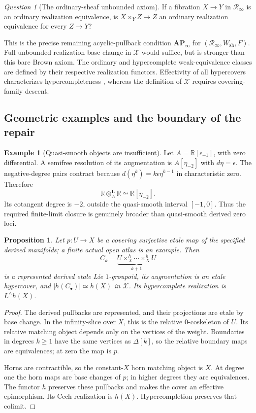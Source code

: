 \documentclass[12pt]{amsart}
\newtheorem{prop}[thm]{Proposition}
\theoremstyle{definition}
\newtheorem{example}[thm]{Example}
\theoremstyle{remark}
\newtheorem{question}[thm]{Question}
\numberwithin{equation}{section}
\newcommand{\R}{\mathbb R}
\begin{document}
\begin{question}[The ordinary-sheaf unbounded axiom]
\label{question:derived-unbounded-ordinary}
If a fibration $X\to Y$ in $\mathscr R_\infty$ is
an ordinary realization equivalence, is
$X\times_Y Z\to Z$ an ordinary realization
equivalence for every $Z\to Y$?
\end{question}

This is the precise remaining acyclic-pullback
condition $\mathbf{AP}_\infty$ for
$(\mathscr R_\infty,W_{\mathrm{sh}},F)$.
Full unbounded realization base change in
$\mathcal X$ would suffice, but is stronger than
this bare Brown axiom.
The ordinary and hypercomplete weak-equivalence classes
are defined by their respective realization functors.
Effectivity of all hypercovers characterizes
hypercompleteness
\cite[Theorem~6.5.3.12 and Corollary~6.5.3.13,
p.~680]{LurieHTT2009}, whereas the definition of
$\mathcal X$ requires covering-family descent.

\subsection{Geometric examples and the boundary of the repair}

\begin{example}[Quasi-smooth objects are insufficient]
Let $A=\R[\epsilon_{-1}]$, with zero differential.
A semifree resolution of its augmentation is
$A[\eta_{-2}]$ with $d\eta=\epsilon$.
The negative-degree pairs contract because
$d(\eta^k)=k\epsilon\eta^{k-1}$ in characteristic
zero. Therefore
\[
 \R\otimes_A^{\mathbf L}\R\simeq\R[\eta_{-2}].
\]
Its cotangent degree is $-2$, outside the
quasi-smooth interval $[-1,0]$.
Thus the required finite-limit closure is genuinely
broader than quasi-smooth derived zero loci.
\end{example}

\begin{prop}\label{prop:derived-cech}
Let $p:U\to X$ be a covering surjective etale map
of the specified derived manifolds; a finite actual
open atlas is an example. Then
\[
 C_k=\underbrace{U\times_X^h\cdots\times_X^h U}_{k+1}
\]
is a represented derived etale Lie $1$-groupoid,
its augmentation is an etale hypercover, and
$|h(C_\bullet)|\simeq h(X)$ in $\mathcal X$.
Its hypercomplete realization is $L^\wedge h(X)$.
\end{prop}

\begin{proof}
The derived pullbacks are represented, and their
projections are etale by base change.
In the infinity-slice over $X$, this is the
relative $0$-coskeleton of $U$.
Its relative matching object depends only on the
vertices of the weight. Boundaries in degrees
$k\ge1$ have the same vertices as $\Delta[k]$,
so the relative boundary maps are equivalences;
at zero the map is $p$.

Horns are contractible, so the constant-$X$ horn
matching object is $X$. At degree one the horn
maps are base changes of $p$; in higher degrees
they are equivalences.
The functor $h$ preserves these pullbacks and
makes the cover an effective epimorphism.
Its Cech realization is $h(X)$.
Hypercompletion preserves that colimit.
\end{proof}
\end{document}
